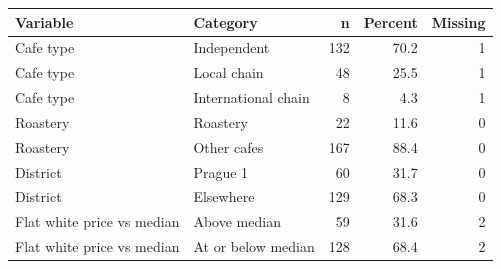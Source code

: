 \begin{tabular}{llrrr}
\toprule
Variable & Category & n & Percent & Missing \\
\midrule
Cafe type & Independent & 132 & 70.2 & 1 \\
Cafe type & Local chain & 48 & 25.5 & 1 \\
Cafe type & International chain & 8 & 4.3 & 1 \\
Roastery & Roastery & 22 & 11.6 & 0 \\
Roastery & Other cafes & 167 & 88.4 & 0 \\
District & Prague 1 & 60 & 31.7 & 0 \\
District & Elsewhere & 129 & 68.3 & 0 \\
Flat white price vs median & Above median & 59 & 31.6 & 2 \\
Flat white price vs median & At or below median & 128 & 68.4 & 2 \\
\bottomrule
\end{tabular}

